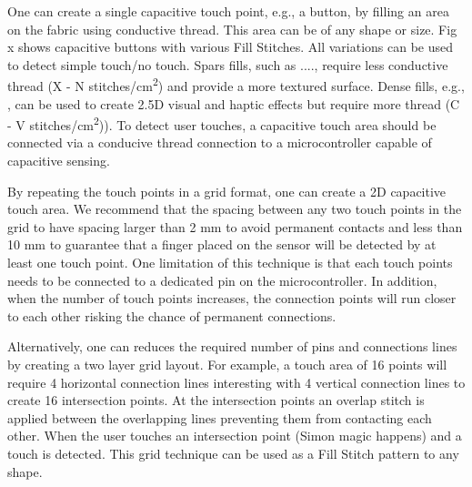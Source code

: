 One can create a single capacitive touch point, e.g., a button, by filling an area on the fabric using conductive thread. This area can be of any shape or size. Fig x shows capacitive buttons with various Fill Stitches. All variations can be used to detect simple touch/no touch. Spars fills, such as ...., require less conductive thread (X - N stitches/cm\textsuperscript{2}) and provide a more textured surface. Dense fills, e.g., , can be used to create 2.5D visual and haptic effects but require more thread (C - V stitches/cm\textsuperscript{2})). To detect user touches, a capacitive touch area should be connected via a conducive thread connection to a microcontroller capable of capacitive sensing.

By repeating the touch points in a grid format, one can create a 2D capacitive touch area. We recommend that the spacing between any two touch points in the grid to have spacing larger than 2 mm to avoid permanent contacts and less than 10 mm to guarantee that a finger placed on the sensor will be detected by at least one touch point. One limitation of this technique is that each touch points needs to be connected to a dedicated pin on the microcontroller. In addition, when the number of touch points increases, the connection points will run closer to each other risking the chance of permanent connections. 

Alternatively, one can reduces the required number of pins and connections lines by creating a two layer grid layout. For example, a touch area of 16 points will require 4 horizontal connection lines interesting with 4 vertical connection lines to create 16 intersection points. At the intersection points an overlap stitch is applied between the overlapping lines preventing them from contacting each other. When the user touches an intersection point (Simon magic happens) and a touch is detected. This grid technique can be used as a Fill Stitch pattern to any shape.



